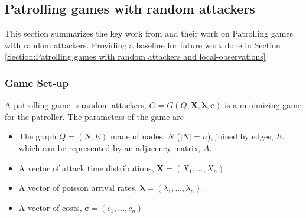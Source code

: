 \documentclass[a4paper,10pt]{article}
\theoremstyle{definition}
\theoremstyle{definition}
\theoremstyle{remark}
\theoremstyle{definition}
\begin{document}
\subsection{Patrolling games with random attackers}
\label{Section:Patrolling games with random attackers}
This section summarizes the key work from \cite{Lin2013} and their work on Patrolling games with random attackers. Providing a baseline for future work done in Section \ref{Section:Patrolling games with random attackers and local-observations}

\subsubsection{Game Set-up}
A patrolling game is random attackers, $G=G(Q,\bm{X},\bm{\lambda},\bm{c})$ is a minimizing game for the patroller. The parameters of the game are

\begin{itemize}
\item The graph $Q=(N,E)$ made of nodes, $N$ ($|N|=n$), joined by edges, $E$, which can be represented by an adjacency matrix, $A$.
\item A vector of attack time distributions, $\bm{X}=(X_{1},...,X_{n})$.
\item A vector of poisson arrival rates, $\bm{\lambda}=(\lambda_{1},...,\lambda_{n})$.
\item A vector of costs, $\bm{c}=(c_{1},...,c_{n})$
\end{itemize}
\end{document}
